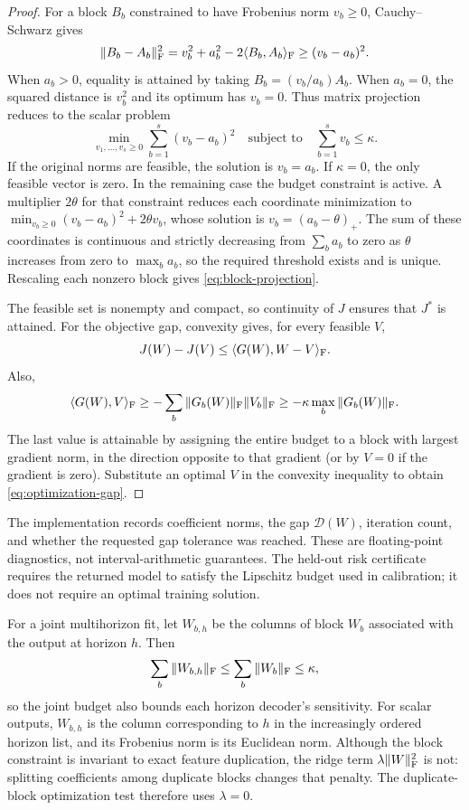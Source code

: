 \begin{proof}
For a block $B_b$ constrained to have Frobenius norm $v_b\geq0$,
Cauchy--Schwarz gives
\[
 \|B_b-A_b\|_{\rm F}^2
 =v_b^2+a_b^2-2\langle B_b,A_b\rangle_{\rm F}
 \geq(v_b-a_b)^2.
\]
When $a_b>0$, equality is attained by taking
$B_b=(v_b/a_b)A_b$. When $a_b=0$, the squared distance is $v_b^2$
and its optimum has $v_b=0$. Thus matrix projection reduces to the scalar problem
\[
 \min_{v_1,\ldots,v_s\geq0}
       \sum_{b=1}^s(v_b-a_b)^2
       \quad\text{subject to}\quad\sum_{b=1}^s v_b\leq\kappa.
\]
If the original norms are feasible, the solution is $v_b=a_b$. If
$\kappa=0$, the only feasible vector is zero. In the remaining case the
budget constraint is active. A multiplier $2\theta$ for that constraint
reduces each coordinate minimization to
$\min_{v_b\geq0}(v_b-a_b)^2+2\theta v_b$, whose solution is
$v_b=(a_b-\theta)_+$. The sum of these coordinates is continuous and
strictly decreasing from $\sum_b a_b$ to zero as $\theta$ increases from
zero to $\max_b a_b$, so the required threshold exists and is unique.
Rescaling each nonzero block gives \eqref{eq:block-projection}.

The feasible set is nonempty and compact, so continuity of $J$ ensures
that $J^*$ is attained. For the objective gap, convexity gives, for every
feasible $V$,
\[
 J(W)-J(V)\leq\langle G(W),W-V\rangle_{\rm F}.
\]
Also,
\[
 \langle G(W),V\rangle_{\rm F}
 \geq-\sum_b\|G_b(W)\|_{\rm F}\|V_b\|_{\rm F}
 \geq-\kappa\max_b\|G_b(W)\|_{\rm F}.
\]
The last value is attainable by assigning the entire budget to a block
with largest gradient norm, in the direction opposite to that gradient
(or by $V=0$ if the gradient is zero). Substitute an optimal $V$ in the
convexity inequality to obtain \eqref{eq:optimization-gap}.
\end{proof}

The implementation records coefficient norms, the gap $\mathcal D(W)$,
iteration count, and whether the requested gap tolerance was reached.
These are floating-point diagnostics, not interval-arithmetic guarantees.
The held-out risk certificate requires the returned model to satisfy the
Lipschitz budget used in calibration; it does not require an optimal
training solution.

For a joint multihorizon fit, let $W_{b,h}$ be the columns of block $W_b$
associated with the output at horizon $h$. Then
\[
 \sum_b\|W_{b,h}\|_{\rm F}
 \leq\sum_b\|W_b\|_{\rm F}\leq\kappa,
\]
so the joint budget also bounds each horizon decoder's sensitivity.
For scalar outputs, $W_{b,h}$ is the column corresponding to $h$ in the
increasingly ordered horizon list, and its Frobenius norm is its Euclidean
norm. Although the block constraint is invariant to exact
feature duplication, the ridge term $\lambda\|W\|_{\rm F}^2$ is not:
splitting coefficients among duplicate blocks changes that penalty.
The duplicate-block optimization test therefore uses $\lambda=0$.

